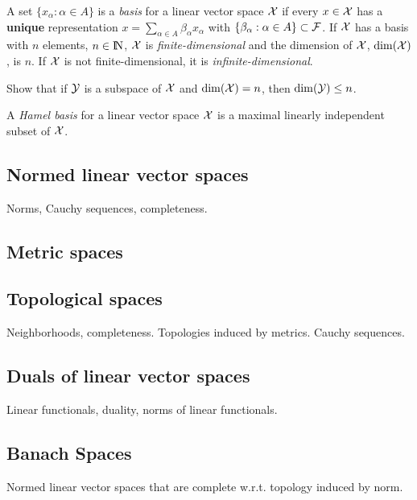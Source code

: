 \begin{Definition}
        A set $\{ x_\alpha : \alpha \in A \}$ is a {\em basis\/} for a linear vector
        space ${\cal X}$ if every $x \in {\cal X}$ has a {\bf unique\/} representation
        $x = \sum_{\alpha \in A} \beta_\alpha x_\alpha$ with
        $\{ \beta_\alpha: \alpha \in A\} \subset {\cal F}$.
        If ${\cal X}$ has a basis with $n$ elements, $n \in \hbox{I\kern-.17em\hbox{N}}$, ${\cal X}$ is {\em finite-dimensional\/}
        and the dimension of ${\cal X}$, $\dim({\cal X})$, is $n$.
        If ${\cal X}$ is not finite-dimensional, it is {\em infinite-dimensional\/}.
\end{Definition}

\begin{Exercise}
        Show that if ${\cal Y}$ is a subspace of ${\cal X}$ and $\dim({\cal X})=n$,
        then $\dim({\cal Y}) \le n$.
\end{Exercise}

\begin{Definition}
        A {\em Hamel basis\/} for a linear vector space ${\cal X}$ is a maximal linearly independent
        subset of ${\cal X}$.
\end{Definition}

\subsection{Normed linear vector spaces}
Norms, Cauchy sequences, completeness.

\subsection{Metric spaces}


\subsection{Topological spaces}
Neighborhoods, completeness.  Topologies induced by metrics.
Cauchy sequences.

\subsection{Duals of linear vector spaces}
Linear functionals, duality, norms of linear functionals.

\subsection{Banach Spaces}
Normed linear vector spaces that are complete w.r.t. topology induced by norm.

